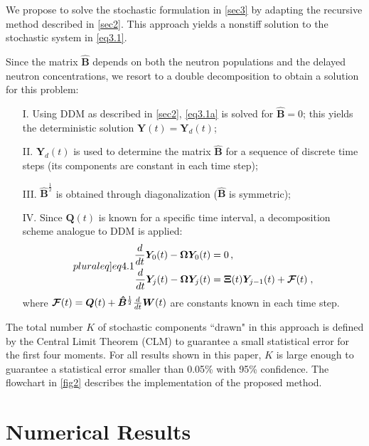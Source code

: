 \documentclass[preprint,12pt,authoryear]{elsarticle}
\begin{document}
We propose to solve the stochastic formulation in \cref{sec3} by adapting the recursive method described in \cref{sec2}.
This approach yields a nonstiff solution to the stochastic system in \cref{eq3.1}.

Since the matrix $\bm{\hat{B}}$ depends on both the neutron populations
and the delayed neutron concentrations, we resort to a double decomposition to obtain a solution for this problem:
\begin{itemize}
\item[I.] Using DDM as described in \cref{sec2}, \cref{eq3.1a} is solved for $\bm{\hat{B}}=0$; this yields the deterministic solution $\bm Y(t)=\bm Y_d(t)$;
\item[II.] $\bm Y_d(t)$ is used to determine the matrix $\bm{\hat{B}}$ for a sequence of discrete time steps (its components are constant in each time step);
\item[III.] $\bm{\hat{B}}^\frac{1}{2}$ is obtained through diagonalization ($\bm{\hat{B}}$ is symmetric);
\item[IV.] Since $\bm Q(t)$ is known for a specific time interval, a decomposition scheme analogue to DDM is applied:
\begin{subequations}\label[pluraleq]{eq4.1}%
\begin{align}
 \frac{d}{dt}\bm Y_0(t)-\bm\Omega \bm Y_0(t)&=0\,,\\ 
\frac{d}{dt}\bm Y_j (t)-\bm\Omega \bm Y_j (t)&=
\bm{\Xi}(t)\bm Y_{j-1}(t)+\bm{{\cal{F}}}(t) \; ,
\end{align}
\end{subequations}
where $\bm{{\cal{F}}}(t) =\bm Q(t)+\bm{\hat{B}}^\frac{1}{2}\frac{d}{dt} {\bm{W}}(t)$ are constants known in each time step.
\end{itemize}

The total number $K$ of stochastic components ``drawn" in this approach is defined by the Central Limit Theorem (CLM) to guarantee a small statistical error for the first four moments.
For all results shown in this paper, $K$ is large enough to guarantee a statistical error smaller than 0.05\% with 95\% confidence. 
The flowchart in \cref{fig2} describes the implementation of the proposed method.

\section{Numerical Results}
\label{sec5}
\setcounter{section}{5}
\setcounter{equation}{0} 
\end{document}
